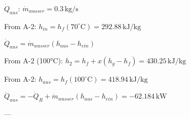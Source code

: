 \( \dot{Q}_{aus} \):  
\( \dot{m}_{wasser} = 0.3 \, \text{kg/s} \)  

From A-2:  
\( h_{in} = h_{f}(70^\circ \text{C}) = 292.88 \, \text{kJ/kg} \)  

\( \dot{Q}_{aus} = \dot{m}_{wasser} (h_{aus} - h_{ein}) \)  

From A-2 (100°C):  
\( h_{2} = h_{f} + x(h_{g} - h_{f}) = 430.25 \, \text{kJ/kg} \)  

From A-2:  
\( h_{aus} = h_{f}(100^\circ \text{C}) = 418.94 \, \text{kJ/kg} \)  

\( \dot{Q}_{aus} = -\dot{Q}_{R} + \dot{m}_{wasser}(h_{aus} - h_{ein}) = -62.184 \, \text{kW} \)  

---